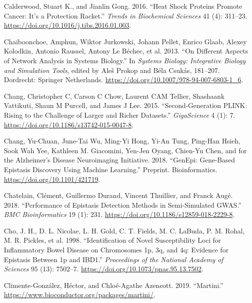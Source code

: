 \documentclass[
  11pt,
]{env/yjiao}
\newlength{\cslhangindent}
\newenvironment{cslreferences}%
  {\setlength{\parindent}{0pt}%
  \everypar{\setlength{\hangindent}{\cslhangindent}}\ignorespaces}%
  {\par}
\begin{document}
\begin{cslreferences}
\leavevmode\hypertarget{ref-calderwood_heat_2016}{}%
Calderwood, Stuart K., and Jianlin Gong. 2016. ``Heat Shock Proteins Promote Cancer: It's a Protection Racket.'' \emph{Trends in Biochemical Sciences} 41 (4): 311--23. \url{https://doi.org/10.1016/j.tibs.2016.01.003}.

\leavevmode\hypertarget{ref-Chaiboonchoe2013}{}%
Chaiboonchoe, Amphun, Wiktor Jurkowski, Johann Pellet, Enrico Glaab, Alexey Kolodkin, Antonio Raussel, Antony Le Béchec, et al. 2013. ``On Different Aspects of Network Analysis in Systems Biology.'' In \emph{Systems Biology: Integrative Biology and Simulation Tools}, edited by Aleš Prokop and Béla Csukás, 181--207. Dordrecht: Springer Netherlands. \url{https://doi.org/10.1007/978-94-007-6803-1_6}.

\leavevmode\hypertarget{ref-chang_second-generation_2015}{}%
Chang, Christopher C, Carson C Chow, Laurent CAM Tellier, Shashaank Vattikuti, Shaun M Purcell, and James J Lee. 2015. ``Second-Generation PLINK: Rising to the Challenge of Larger and Richer Datasets.'' \emph{GigaScience} 4 (1): 7. \url{https://doi.org/10.1186/s13742-015-0047-8}.

\leavevmode\hypertarget{ref-chang_genepi:_2018}{}%
Chang, Yu-Chuan, June-Tai Wu, Ming-Yi Hong, Yi-An Tung, Ping-Han Hsieh, Sook Wah Yee, Kathleen M. Giacomini, Yen-Jen Oyang, Chien-Yu Chen, and for the Alzheimer's Disease Neuroimaging Initiative. 2018. ``GenEpi: Gene-Based Epistasis Discovery Using Machine Learning.'' Preprint. Bioinformatics. \url{https://doi.org/10.1101/421719}.

\leavevmode\hypertarget{ref-chatelain_performance_2018}{}%
Chatelain, Clément, Guillermo Durand, Vincent Thuillier, and Franck Augé. 2018. ``Performance of Epistasis Detection Methods in Semi-Simulated GWAS.'' \emph{BMC Bioinformatics} 19 (1): 231. \url{https://doi.org/10.1186/s12859-018-2229-8}.

\leavevmode\hypertarget{ref-cho_identification_1998}{}%
Cho, J. H., D. L. Nicolae, L. H. Gold, C. T. Fields, M. C. LaBuda, P. M. Rohal, M. R. Pickles, et al. 1998. ``Identification of Novel Susceptibility Loci for Inflammatory Bowel Disease on Chromosomes 1p, 3q, and 4q: Evidence for Epistasis Between 1p and IBD1.'' \emph{Proceedings of the National Academy of Sciences} 95 (13): 7502--7. \url{https://doi.org/10.1073/pnas.95.13.7502}.

\leavevmode\hypertarget{ref-martini}{}%
Climente-González, Héctor, and Chloé-Agathe Azencott. 2019. ``Martini.'' \url{https://www.bioconductor.org/packages/martini/}.


\end{cslreferences}
\end{document}
